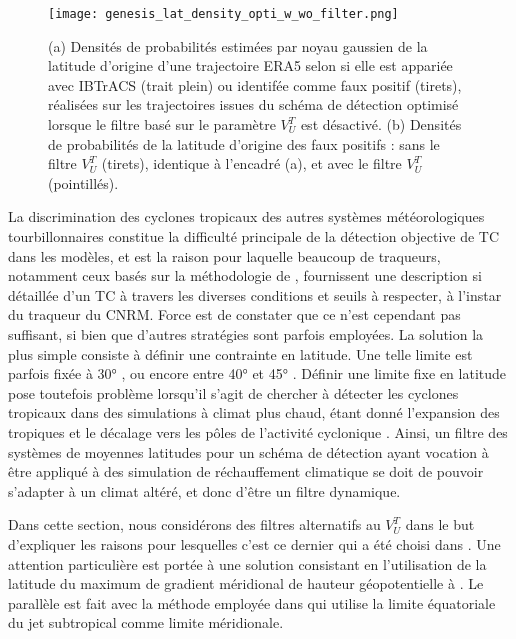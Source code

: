 \documentclass[../main.tex]{subfiles}
\begin{document}
\begin{figure}[tb]
    \centering
    \texttt{[image: genesis\_lat\_density\_opti\_w\_wo\_filter.png]}
    \caption{(a) Densités de probabilités estimées par noyau gaussien de la latitude d'origine d'une trajectoire ERA5 selon si elle est appariée avec IBTrACS
    (trait plein) ou identifée comme faux positif (tirets), réalisées sur les trajectoires issues du schéma de détection optimisé lorsque le filtre basé sur
    le paramètre $V_U^T$ est désactivé. (b) Densités de probabilités de la latitude d'origine des faux positifs : sans le filtre $V_U^T$ (tirets), identique
    à l'encadré (a), et avec le filtre $V_U^T$ (pointillés).}
    \label{fig:lat_density}
\end{figure}

La discrimination des cyclones tropicaux des autres systèmes météorologiques tourbillonnaires constitue la difficulté principale de la détection objective de TC
dans les modèles, et est la raison pour laquelle beaucoup de traqueurs, notamment ceux basés sur la méthodologie de \cite{bengtsson_hurricanetype_1995},
fournissent une description si détaillée d'un TC à travers les diverses conditions et seuils à respecter, à l'instar du traqueur du CNRM. Force est de constater
que ce n'est cependant pas suffisant, si bien que d'autres stratégies sont parfois employées. La solution la plus simple consiste à définir une contrainte en
latitude. Une telle limite est parfois fixée à \ang{30} \parencite{bengtsson_simulation_1982,broccoli_can_1990,mcdonald_tropical_2005}, ou encore entre \ang{40}
et \ang{45} \parencite{wu_gcm_1992,tsutsui_simulated_1996,tsutsui_implications_2002,oouchi_tropical_2006,zarzycki_multidecadal_2014}. Définir une limite fixe en
latitude pose toutefois problème lorsqu'il s'agit de chercher à détecter les cyclones tropicaux dans des simulations à climat plus chaud, étant donné
l'expansion des tropiques \parencite{lucas_expanding_2014,staten_reexamining_2018} et le décalage vers les pôles de l'activité cyclonique
\parencite{kossin_poleward_2014,knutson_tropical_2020}. Ainsi, un filtre des systèmes de moyennes latitudes pour un schéma de détection ayant vocation à être
appliqué à des simulation de réchauffement climatique se doit de pouvoir s'adapter à un climat altéré, et donc d'être un filtre dynamique.

Dans cette section, nous considérons des filtres alternatifs au $V_U^T$ dans le but d'expliquer les raisons pour lesquelles c'est ce dernier qui a été choisi
dans \cite{dulac_assessing_2023}. Une attention particulière est portée à une solution consistant en l'utilisation de la latitude du maximum de gradient
méridional de hauteur géopotentielle à . Le parallèle est fait avec la méthode employée dans \cite{bourdin_intercomparison_2022} qui utilise la limite
équatoriale du jet subtropical comme limite méridionale.
\end{document}
